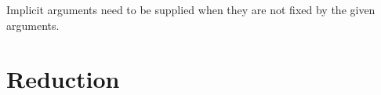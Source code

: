 Implicit arguments need to be supplied when they are not fixed by the
given arguments.

\hypertarget{reduction-9}{%
\section{Reduction}\label{reduction-9}}

\begin{fence}
\begin{code}%
\>[0]\AgdaSpace{}%
\AgdaSpace{}%
\<%
\\
%
\\[\AgdaEmptyExtraSkip]%
\>[0]\AgdaSpace{}%
\AgdaSpace{}%
\AgdaSymbol{:}\AgdaSpace{}%
\AgdaSpace{}%
\AgdaSymbol{\{}\AgdaSpace{}%
\AgdaSymbol{\}}\AgdaSpace{}%
\AgdaSpace{}%
\AgdaSymbol{(}\AgdaSpace{}%
\AgdaSpace{}%
\AgdaSymbol{)}\AgdaSpace{}%
\AgdaSpace{}%
\AgdaSymbol{(}\AgdaSpace{}%
\AgdaSpace{}%
\AgdaSymbol{)}\AgdaSpace{}%
\AgdaSpace{}%
\AgdaSpace{}%
\<%
\\
%
\\[\AgdaEmptyExtraSkip]%
\>[0][@{}l@{\AgdaIndent{0}}]%
\>[2]\<%
\\
%
\\[\AgdaEmptyExtraSkip]%
%
\>[2]\AgdaSpace{}%
\AgdaSymbol{:}\AgdaSpace{}%
\AgdaSpace{}%
\AgdaSymbol{\{}\AgdaSpace{}%
\AgdaSpace{}%
\AgdaSymbol{\}}\AgdaSpace{}%
\AgdaSymbol{\{}\AgdaSpace{}%
\AgdaSpace{}%
\AgdaSymbol{:}\AgdaSpace{}%
\AgdaSpace{}%
\AgdaSpace{}%
\AgdaSpace{}%
\AgdaSpace{}%
\AgdaSymbol{\}}\AgdaSpace{}%
\AgdaSymbol{\{}\AgdaSpace{}%
\AgdaSymbol{:}\AgdaSpace{}%
\AgdaSpace{}%
\AgdaSpace{}%
\AgdaSymbol{\}}\<%
\\
\>[2][@{}l@{\AgdaIndent{0}}]%
\>[4]%
\>[974I]\AgdaSpace{}%
\AgdaSpace{}%
\<%
\\

\end{code}
\end{fence}
